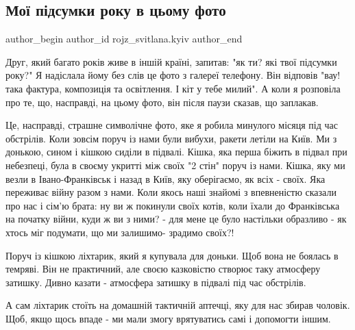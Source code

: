  
 
 
 
 
 
\subsection{Мої підсумки року в цьому фото}
\label{sec:28_12_2022.fb.rojz_svitlana.kyiv.1.foto_pidsumky}
 
\ifcmt
 author_begin
   author_id rojz_svitlana.kyiv
 author_end
\fi

Друг, який багато років живе в іншій країні, запитав: "як ти? які твої підсумки
року?" Я надіслала йому без слів це фото з галереї телефону. Він відповів "вау!
така фактура, композиція та освітлення. І кіт у тебе милий". А коли я розповіла
про те, що, насправді, на цьому фото, він після паузи сказав, що заплакав. 

Це, насправді, страшне символічне фото, яке я робила минулого місяця під час
обстрілів. Коли зовсім поруч із нами були вибухи, ракети летіли на Київ. Ми з
донькою, сином і кішкою сиділи в підвалі. Кішка, яка перша біжить в підвал при
небезпеці,  була в своєму укритті між своїх "2 стін" поруч із нами. Кішка, яку
ми везли в Івано-Франківськ і назад в Київ, яку оберігаємо, як всіх - своїх.
Яка переживає війну разом з нами. Коли якось наші знайомі з впевненістю сказали
про нас і сім'ю брата: ну ви ж покинули своїх котів, коли їхали до Франківська
на початку війни, куди ж ви з ними? - для мене це було настільки образливо - як
хтось міг подумати, що ми залишимо- зрадимо своїх?!

Поруч із кішкою ліхтарик, який я купувала для доньки. Щоб вона не боялась в
темряві. Він не практичний, але своєю казковістю створює таку атмосферу
затишку. Дивно казати - атмосфера затишку в підвалі під час обстрілів. 

А сам ліхтарик стоїть на домашній тактичній аптечці, яку для нас збирав
чоловік. Щоб, якщо щось впаде - ми мали змогу врятуватись самі і допомогти
іншим.

